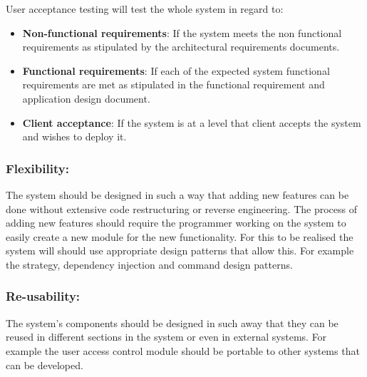 \begin{flushleft}
\begin{flushleft}
\begin{itemize}
\end{itemize}

User acceptance testing will test the whole system in regard to:
\begin{itemize}

\item\textbf{Non-functional requirements}: If the system meets the non functional requirements as stipulated by the architectural requirements documents.
\item\textbf{Functional requirements}: If each of the expected system functional requirements are met as stipulated in the functional requirement and application design document.
\item\textbf{Client acceptance}: If the system is at a level that client accepts the system and wishes to deploy it.

\end{itemize}

\end{flushleft}



\end{flushleft}


\subsubsection{Flexibility:}

\begin{flushleft}

The system should be designed in such a way that adding new features can be done without extensive code restructuring or reverse engineering. The process of adding new features should require the programmer working on the system to easily create a new module for the new functionality. For this to be realised the system will should use appropriate design patterns that allow this. For example the strategy, dependency injection and command design patterns. 

\end{flushleft}


\subsubsection{Re-usability:}

\begin{flushleft}

The system's components should be designed in such away that they can be reused in different sections in the system or even in external systems. For example the user access control module should be portable to other systems that can be developed.

\end{flushleft}

